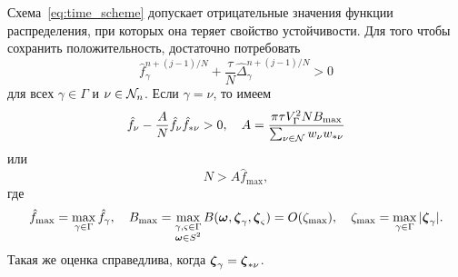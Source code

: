 Схема~\eqref{eq:time_scheme} допускает отрицательные значения функции распределения,
при которых она теряет свойство устойчивости.
Для того чтобы сохранить положительность, достаточно потребовать
\begin{equation}\label{eq:positive_f}
    \hat{f}_\gamma^{n+(j-1)/N} + \frac{\tau}N \hat{\Delta}_\gamma^{n+(j-1)/N} > 0
\end{equation}
для всех \(\gamma\in\Gamma\) и \(\nu\in\mathcal{N}_n\).
Если \(\gamma = \nu\), то имеем
\begin{equation}\label{eq:positive_f_alpha}
    \hat{f}_{\nu} - \frac{A}{N}\hat{f}_{\nu}\hat{f}_{*\nu} > 0, \quad
    A = \frac{\pi\tau V_\Gamma^2 N B_{\max}}{\sum_{\nu\in\mathcal{N}} w_{\nu}w_{*\nu}}
\end{equation}
или
\begin{equation}\label{eq:positive_f_alpha2}
    N > A \hat{f}_{\max},
\end{equation}
где
\begin{equation}\label{eq:f_B_max}
    \hat{f}_{\max} = \max_{\gamma\in\Gamma} \hat{f}_\gamma, \quad
    B_{\max} = \max_{\substack{\gamma,\varsigma\in\Gamma\\\boldsymbol{\omega}\in S^2}}
        B(\boldsymbol{\omega}, {\boldsymbol{\zeta}}_{\gamma}, {\boldsymbol{\zeta}}_{\varsigma}) = O(\zeta_{\max}), \quad
    \zeta_{\max} = \max_{\gamma\in\Gamma}|{\boldsymbol{\zeta}}_\gamma|.
\end{equation}
Такая же оценка справедлива, когда \({\boldsymbol{\zeta}}_\gamma = {\boldsymbol{\zeta}}_{*\nu}\).

